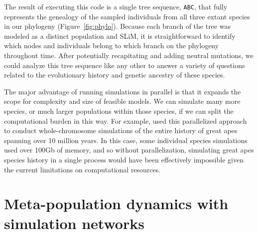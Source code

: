 \documentclass[12pt]{article}
\begin{document}
% 
% 
The result of executing this code is a single tree sequence,
\verb|ABC|,
that fully represents the genealogy of the sampled individuals from all three extant species in our phylogeny (Figure~\ref{fig:phylo}).
Because each branch of the tree was modeled as a distinct population and SLiM, it is straightforward to identify which nodes and individuals belong
to which branch on the phylogeny throughout time.
After potentially recapitating and adding neutral mutations, we could analyze this tree sequence
like any other to answer a variety of questions related to the evolutionary history and genetic ancestry of these species.

The major advantage of running simulations in parallel is that it expands the scope for complexity and size of feasible models.
We can simulate many more species, or much larger
populations within those species, if we can split the computational burden in this way.
For example, \citet{rodrigues_shared_2024} used this parallelized approach to conduct
whole-chromosome simulations of the entire history of great apes spanning over 10 million years.
In this case, some individual species simulations used over 100Gb of memory,
and so without parallelization, simulating great apes species history in a single process would have been effectively impossible given the current limitations on computational resources.

\section{Meta-population dynamics with simulation networks}
\end{document}
